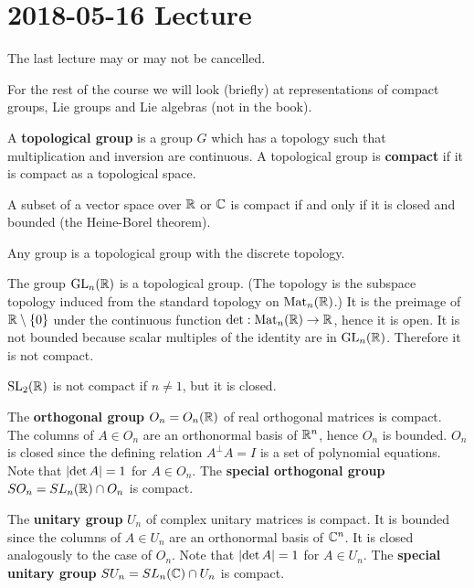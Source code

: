 \section{2018-05-16 Lecture}

The last lecture may or may not be cancelled.

For the rest of the course we will look (briefly) at representations of compact groups, Lie groups and Lie algebras (not in the book).

\begin{defn}
  A \textbf{topological group} is a group $G$ which has a topology such that multiplication and inversion are continuous.
  A topological group is \textbf{compact} if it is compact as a topological space.
\end{defn}

\begin{rmk}
  A subset of a vector space over $\mathbb{R}$ or $\mathbb{C}$ is compact if and only if it is closed and bounded (the Heine-Borel theorem).
\end{rmk}

\begin{exam}
  \lv
  \begin{enum}
    \io
    Any group is a topological group with the discrete topology.

    \io
    The group $\operatorname{GL}_n(\mathbb{R})$ is a topological group.
    (The topology is the subspace topology induced from the standard topology on $\operatorname{Mat}_n(\mathbb{R})$.)
    It is the preimage of $\mathbb{R}\setminus\{0\}$ under the continuous function $\det: \operatorname{Mat}_n(\mathbb{R}) \to \mathbb{R}$, hence it is open.
    It is not bounded because scalar multiples of the identity are in $\operatorname{GL}_n(\mathbb{R})$.
    Therefore it is not compact.

    \io
    $\operatorname{SL}_2(\mathbb{R})$ is not compact if $n \neq 1$, but it is closed.

    \io
    The \textbf{orthogonal group} $O_n=O_n(\mathbb{R})$ of real orthogonal matrices is compact.
    The columns of $A \in O_n$ are an orthonormal basis of $\mathbb{R}^n$, hence $O_n$ is bounded.
    $O_n$ is closed since the defining relation $A^\perp A=I$ is a set of polynomial equations.
    Note that $\left\lvert \det A \right\rvert=1$ for $A \in O_n$.
    The \textbf{special orthogonal group} $SO_n=SL_n(\mathbb{R}) \cap O_n$ is compact.

    \io
    The \textbf{unitary group} $U_n$ of complex unitary matrices is compact.
    It is bounded since the columns of $A \in U_n$ are an orthonormal basis of $\mathbb{C}^n$.
    It is closed analogously to the case of $O_n$.
    Note that $\left\lvert \det A \right\rvert=1$ for $A \in U_n$.
    The \textbf{special unitary group} $SU_n = SL_n(\mathbb{C}) \cap U_n$ is compact.
  \end{enum}
\end{exam}

